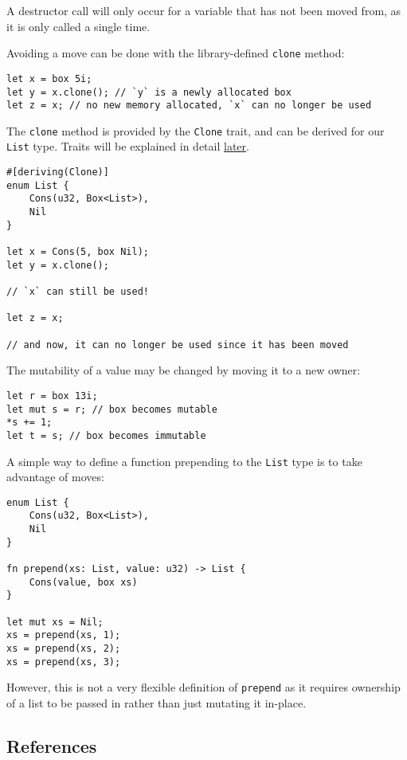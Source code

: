 \documentclass[]{article}
\begin{document}
A destructor call will only occur for a variable that has not been moved
from, as it is only called a single time.

Avoiding a move can be done with the library-defined \texttt{clone}
method:

\begin{verbatim}
let x = box 5i;
let y = x.clone(); // `y` is a newly allocated box
let z = x; // no new memory allocated, `x` can no longer be used
\end{verbatim}

The \texttt{clone} method is provided by the \texttt{Clone} trait, and
can be derived for our \texttt{List} type. Traits will be explained in
detail \hyperref[traits]{later}.

\begin{verbatim}
#[deriving(Clone)]
enum List {
    Cons(u32, Box<List>),
    Nil
}

let x = Cons(5, box Nil);
let y = x.clone();

// `x` can still be used!

let z = x;

// and now, it can no longer be used since it has been moved
\end{verbatim}

The mutability of a value may be changed by moving it to a new owner:

\begin{verbatim}
let r = box 13i;
let mut s = r; // box becomes mutable
*s += 1;
let t = s; // box becomes immutable
\end{verbatim}

A simple way to define a function prepending to the \texttt{List} type
is to take advantage of moves:

\begin{verbatim}
enum List {
    Cons(u32, Box<List>),
    Nil
}

fn prepend(xs: List, value: u32) -> List {
    Cons(value, box xs)
}

let mut xs = Nil;
xs = prepend(xs, 1);
xs = prepend(xs, 2);
xs = prepend(xs, 3);
\end{verbatim}

However, this is not a very flexible definition of \texttt{prepend} as
it requires ownership of a list to be passed in rather than just
mutating it in-place.

\subsection{References}\label{references}
\end{document}
